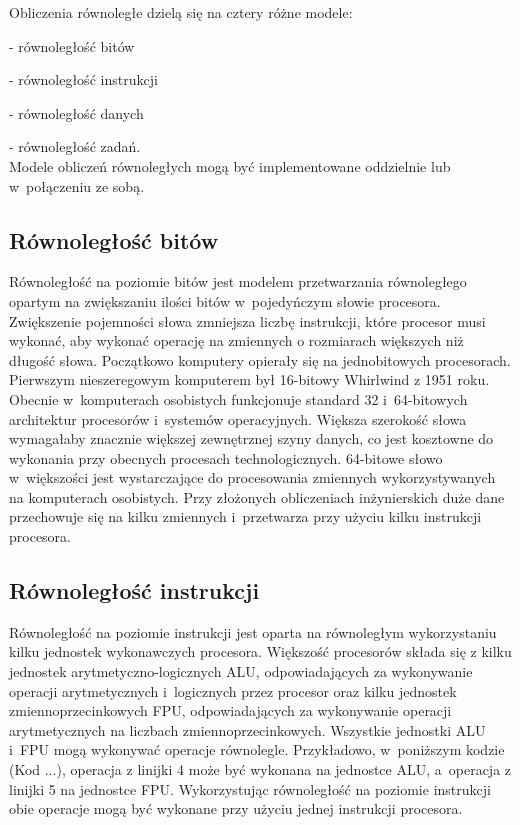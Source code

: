 Obliczenia równoległe dzielą się na cztery różne modele:

- równoległość bitów

- równoległość instrukcji

- równoległość danych

- równoległość zadań.\\

Modele obliczeń równoległych mogą być implementowane oddzielnie lub w~połączeniu ze sobą.

\subsection{Równoległość bitów}\label{sec:bitp}

Równoległość na poziomie bitów jest modelem przetwarzania równoległego opartym na zwiększaniu ilości bitów w~pojedyńczym słowie procesora. Zwiększenie pojemności słowa zmniejsza liczbę instrukcji, które procesor musi wykonać, aby wykonać operację na zmiennych o rozmiarach większych niż długość słowa.
Początkowo komputery opierały się na jednobitowych procesorach. Pierwszym nieszeregowym komputerem był 16-bitowy Whirlwind z 1951 roku. Obecnie w~komputerach osobistych funkcjonuje standard 32 i~64-bitowych architektur procesorów i~systemów operacyjnych. Większa szerokość słowa wymagałaby znacznie większej zewnętrznej szyny danych, co jest kosztowne do wykonania przy obecnych procesach technologicznych. 64-bitowe słowo w~większości jest wystarczające do  procesowania zmiennych wykorzystywanych na komputerach osobistych. Przy złożonych obliczeniach inżynierskich duże dane przechowuje się na kilku zmiennych i~przetwarza przy użyciu kilku instrukcji procesora.

\subsection{Równoległość instrukcji}\label{sec:instp}

Równoległość na poziomie instrukcji jest oparta na równoległym wykorzystaniu kilku jednostek wykonawczych procesora. Większość procesorów składa się z kilku jednostek arytmetyczno-logicznych ALU, odpowiadających za wykonywanie operacji arytmetycznych i~logicznych przez procesor oraz kilku jednostek zmiennoprzecinkowych FPU, odpowiadających za wykonywanie operacji arytmetycznych na liczbach zmiennoprzecinkowych. Wszystkie jednostki ALU i~FPU mogą wykonywać operacje równolegle. Przykładowo, w~poniższym kodzie (Kod ...), operacja z linijki 4 może być wykonana na jednostce ALU, a~operacja z linijki 5 na jednostce FPU. Wykorzystując równoległość na poziomie instrukcji obie operacje mogą być wykonane przy użyciu jednej instrukcji procesora.

